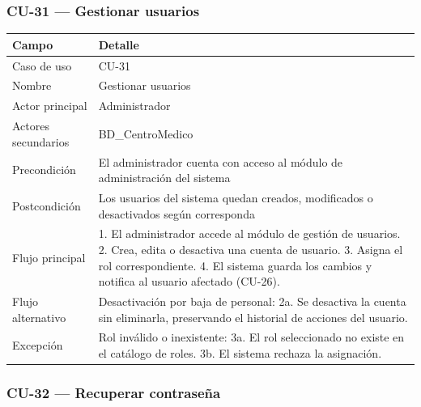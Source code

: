 \documentclass[11pt,a4paper]{article}
\begin{document}
	\subsubsection{CU-31 --- Gestionar usuarios}
	
	\begin{longtable}{p{} p{} }
		\toprule
		\textbf{Campo} & \textbf{Detalle} \\
		\midrule
		\endhead
		Caso de uso & CU-31 \\
		Nombre & Gestionar usuarios \\
		Actor principal & Administrador \\
		Actores secundarios & BD\_CentroMedico \\
		Precondición & El administrador cuenta con acceso al módulo de administración del sistema \\
		Postcondición & Los usuarios del sistema quedan creados, modificados o desactivados según corresponda \\
		Flujo principal & 1. El administrador accede al módulo de gestión de usuarios. 2. Crea, edita o desactiva una cuenta de usuario. 3. Asigna el rol correspondiente. 4. El sistema guarda los cambios y notifica al usuario afectado (CU-26). \\
		Flujo alternativo & Desactivación por baja de personal: 2a. Se desactiva la cuenta sin eliminarla, preservando el historial de acciones del usuario. \\
		Excepción & Rol inválido o inexistente: 3a. El rol seleccionado no existe en el catálogo de roles. 3b. El sistema rechaza la asignación. \\
		\bottomrule
	\end{longtable}
	
	\subsubsection{CU-32 --- Recuperar contraseña}
	
\end{document}
